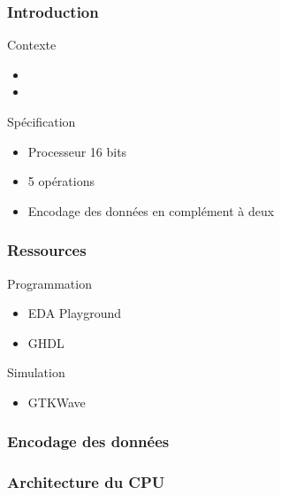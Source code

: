 \documentclass{beamer}
\begin{document}
\begin{frame}
\frametitle{Introduction}
\begin{block}{Contexte}
	\begin{itemize}
		\item 
		\item 
	\end{itemize}
\end{block}
\begin{block}{Spécification}
	\begin{itemize}
		\item Processeur 16 bits
		\item 5 opérations
		\item Encodage des données en complément à deux
	\end{itemize}
\end{block}
\end{frame}

\begin{frame}
\frametitle{Ressources} %
\begin{block}{Programmation}
	\begin{itemize}
		\item EDA Playground
		\item GHDL
	\end{itemize}
\end{block}
\begin{block}{Simulation}
	\begin{itemize}
		\item GTKWave
	\end{itemize}
\end{block}
\end{frame}

\begin{frame}
\frametitle{Encodage des données} %
\end{frame}

\begin{frame}
\frametitle{Architecture du CPU}
\end{frame}
\end{document}
